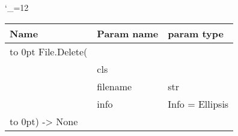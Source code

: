 \begingroup \catcode`\_=12 \tt
\begin{tabular}{lll}
\toprule
\textrm{Name}&\textrm{Param name}&\textrm{param type}\\
\midrule
\hbox to 0pt {File.Delete(\hss}\\
& cls\\
& filename & str\\
& info & Info = Ellipsis\\
\hbox to 0pt{) -> None\hss}\\
\bottomrule
\end{tabular}
\endgroup
